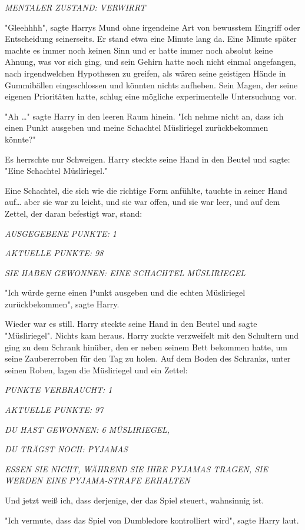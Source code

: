 {\emph{MENTALER ZUSTAND: VERWIRRT}

"Gleehhhh", sagte Harrys Mund ohne irgendeine Art von bewusstem Eingriff oder Entscheidung seinerseits. Er stand etwa eine Minute lang da. Eine Minute später machte es immer noch keinen Sinn und er hatte immer noch absolut keine Ahnung, was vor sich ging, und sein Gehirn hatte noch nicht einmal angefangen, nach irgendwelchen Hypothesen zu greifen, als wären seine geistigen Hände in Gummibällen eingeschlossen und könnten nichts aufheben. Sein Magen, der seine eigenen Prioritäten hatte, schlug eine mögliche experimentelle Untersuchung vor.

"Ah …" sagte Harry in den leeren Raum hinein. "Ich nehme nicht an, dass ich einen Punkt ausgeben und meine Schachtel Müsliriegel zurückbekommen könnte?"

Es herrschte nur Schweigen. Harry steckte seine Hand in den Beutel und sagte: "Eine Schachtel Müsliriegel."

Eine Schachtel, die sich wie die richtige Form anfühlte, tauchte in seiner Hand auf… aber sie war zu leicht, und sie war offen, und sie war leer, und auf dem Zettel, der daran befestigt war, stand:

\emph{AUSGEGEBENE PUNKTE: 1}

\emph{AKTUELLE PUNKTE: 98}

\emph{SIE HABEN GEWONNEN: EINE SCHACHTEL MÜSLIRIEGEL}

"Ich würde gerne einen Punkt ausgeben und die echten Müsliriegel zurückbekommen", sagte Harry.

Wieder war es still. Harry steckte seine Hand in den Beutel und sagte "Müsliriegel". Nichts kam heraus. Harry zuckte verzweifelt mit den Schultern und ging zu dem Schrank hinüber, den er neben seinem Bett bekommen hatte, um seine Zaubererroben für den Tag zu holen. Auf dem Boden des Schranks, unter seinen Roben, lagen die Müsliriegel und ein Zettel:

\emph{PUNKTE VERBRAUCHT: 1}

\emph{AKTUELLE PUNKTE: 97}

\emph{DU HAST GEWONNEN: 6 MÜSLIRIEGEL,}

\emph{DU TRÄGST NOCH: PYJAMAS}

\emph{ESSEN SIE NICHT, WÄHREND SIE IHRE PYJAMAS TRAGEN, SIE WERDEN EINE PYJAMA-STRAFE ERHALTEN}

Und jetzt weiß ich, dass derjenige, der das Spiel steuert, wahnsinnig ist.

"Ich vermute, dass das Spiel von Dumbledore kontrolliert wird", sagte Harry laut.

}

